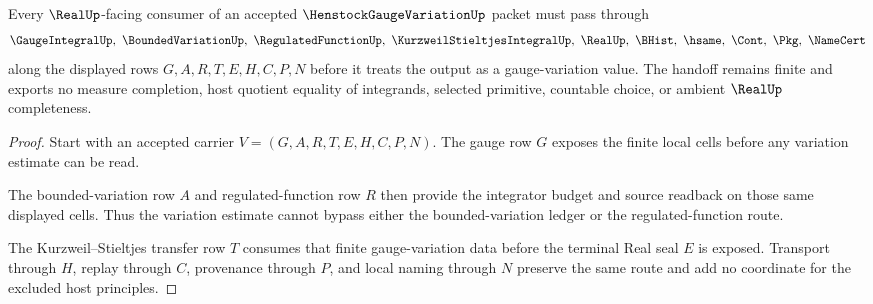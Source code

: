 \begin{theorem}
\label{thm:henstock-gauge-variation-finite-handoff}
Every $\RealUp$-facing consumer of an accepted $\HenstockGaugeVariationUp$ packet must pass through
$$
\GaugeIntegralUp,\ \BoundedVariationUp,\ \RegulatedFunctionUp,\ \KurzweilStieltjesIntegralUp,\ \RealUp,\ \BHist,\ \hsame,\ \Cont,\ \Pkg,\ \NameCert
$$
along the displayed rows $G,A,R,T,E,H,C,P,N$ before it treats the output as a gauge-variation value. The handoff remains finite and exports no measure completion, host quotient equality of integrands, selected primitive, countable choice, or ambient $\RealUp$ completeness.
\end{theorem}
\begin{proof}
Start with an accepted carrier $V=(G,A,R,T,E,H,C,P,N)$. The gauge row $G$ exposes the finite local cells before any variation estimate can be read.

The bounded-variation row $A$ and regulated-function row $R$ then provide the integrator budget and source readback on those same displayed cells. Thus the variation estimate cannot bypass either the bounded-variation ledger or the regulated-function route.

The Kurzweil--Stieltjes transfer row $T$ consumes that finite gauge-variation data before the terminal Real seal $E$ is exposed. Transport through $H$, replay through $C$, provenance through $P$, and local naming through $N$ preserve the same route and add no coordinate for the excluded host principles.
\end{proof}



